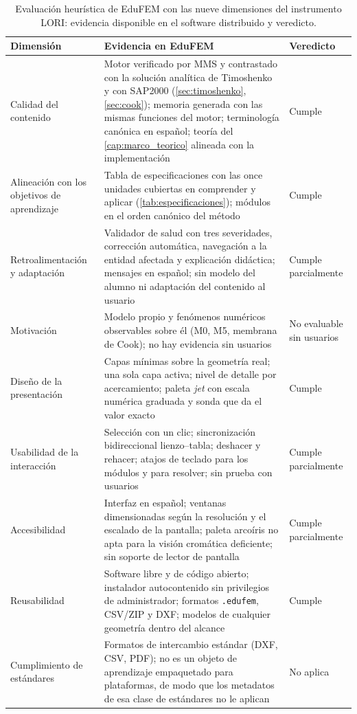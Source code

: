 \begin{table}[htbp]
\centering
\caption[Evaluación heurística de EduFEM con las nueve dimensiones de LORI.]{Evaluación heurística de EduFEM con las nueve dimensiones del instrumento LORI: evidencia disponible en el software distribuido y veredicto.}
\label{tab:lori}
{\footnotesize
\setlength{\tabcolsep}{3pt}
\renewcommand{\arraystretch}{1.15}
\begin{tabular}{@{}>{\raggedright\arraybackslash}p{2.8cm}>{\raggedright\arraybackslash}p{9.2cm}>{\raggedright\arraybackslash}p{2.7cm}@{}}
\toprule
\textbf{Dimensión} & \textbf{Evidencia en EduFEM} & \textbf{Veredicto} \\
\midrule
Calidad del contenido & Motor verificado por MMS y contrastado con la solución analítica de Timoshenko y con SAP2000 (\autoref{sec:timoshenko}, \autoref{sec:cook}); memoria generada con las mismas funciones del motor; terminología canónica en español; teoría del \autoref{cap:marco_teorico} alineada con la implementación & Cumple \\
Alineación con los objetivos de aprendizaje & Tabla de especificaciones con las once unidades cubiertas en comprender y aplicar (\autoref{tab:especificaciones}); módulos en el orden canónico del método & Cumple \\
Retroalimentación y adaptación & Validador de salud con tres severidades, corrección automática, navegación a la entidad afectada y explicación didáctica; mensajes en español; sin modelo del alumno ni adaptación del contenido al usuario & Cumple parcialmente \\
Motivación & Modelo propio y fenómenos numéricos observables sobre él (M0, M5, membrana de Cook); no hay evidencia sin usuarios & No evaluable sin usuarios \\
Diseño de la presentación & Capas mínimas sobre la geometría real; una sola capa activa; nivel de detalle por acercamiento; paleta \emph{jet} con escala numérica graduada y sonda que da el valor exacto & Cumple \\
Usabilidad de la interacción & Selección con un clic; sincronización bidireccional lienzo--tabla; deshacer y rehacer; atajos de teclado para los módulos y para resolver; sin prueba con usuarios & Cumple parcialmente \\
Accesibilidad & Interfaz en español; ventanas dimensionadas según la resolución y el escalado de la pantalla; paleta arcoíris no apta para la visión cromática deficiente; sin soporte de lector de pantalla & Cumple parcialmente \\
Reusabilidad & Software libre y de código abierto; instalador autocontenido sin privilegios de administrador; formatos \texttt{.edufem}, CSV/ZIP y DXF; modelos de cualquier geometría dentro del alcance & Cumple \\
Cumplimiento de estándares & Formatos de intercambio estándar (DXF, CSV, PDF); no es un objeto de aprendizaje empaquetado para plataformas, de modo que los metadatos de esa clase de estándares no le aplican & No aplica \\
\bottomrule
\end{tabular}}
\end{table}


